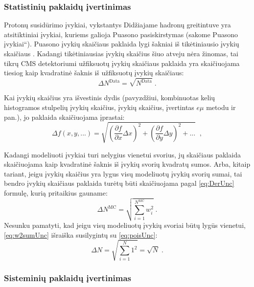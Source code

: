 \documentclass[a4paper, 12pt]{article}
\newcommand{\ltq}[1]{{\quotedblbase{}#1\textquotedblleft{}}}
\newlength\q
\begin{document}
\subsubsection{Statistinių paklaidų įvertinimas}
Protonų susidūrimo įvykiai, vykstantys Didžiajame hadronų greitintuve yra atsitiktiniai įvykiai, kuriems galioja Puasono pasiskirstymas (sakome \ltq{Puasono įvykiai}). Puasono įvykių skaičiaus paklaida lygi šakniai iš tikėtiniausio įvykių skaičiaus \cite{Poisson}. Kadangi tikėtiniausias įvykių skaičius šiuo atveju nėra žinomas, tai tikrų CMS detektoriumi užfiksuotų įvykių skaičiaus paklaida yra skaičiuojama tiesiog kaip kvadratinė šaknis iš užfiksuotų įvykių skaičiaus:
\begin{equation}
\Delta N^{\mathrm{Data}} = \sqrt{N^{\mathrm{Data}}} \; .
\label{eq:poisUnc}
\end{equation}

Kai įvykių skaičius yra išvestinis dydis (pavyzdžiui, kombinuotas kelių histogramos stulpelių įvykių skaičius, įvykių skaičius, įvertintas $e\mu$ metodu ir pan.), jo paklaida skaičiuojama įprastai:
\begin{equation}
\Delta f(x, y, ...) = \sqrt{\left(\frac{\partial f}{\partial x}\Delta x\right)^{2}+\left(\frac{\partial f}{\partial y}\Delta y\right)^{2}+...} \;\; \mathrm{,}
\label{eq:DerUnc}
\end{equation}

Kadangi modeliuoti įvykiai turi nelygius vienetui svorius, jų skaičiaus paklaida skaičiuojama kaip kvadratinė šaknis iš įvykių svorių kvadratų sumos. Arba, kitaip tariant, jeigu įvykių skaičius yra lygus visų modeliuotų įvykių svorių sumai, tai bendro įvykių skaičiaus paklaida turėtų būti skaičiuojama pagal \eqref{eq:DerUnc} formulę, kurią pritaikius gauname:
\begin{equation}
\Delta N^{\mathrm{MC}} = \sqrt{\sum_{i=1}^{N^{\mathrm{MC}}}w_{i}^{2}} \; .
\label{eq:w2sumUnc}
\end{equation}
Nesunku pamatyti, kad jeigu visų modeliuotų įvykių svoriai būtų lygūs vienetui, \eqref{eq:w2sumUnc} išraiška susilygintų su \eqref{eq:poisUnc}:
\begin{equation}
\Delta N = \sqrt{\sum_{i=1}^{N}1^{2}}=\sqrt{N} \; .
\label{eq:Useless}
\end{equation}

\subsubsection{Sisteminių paklaidų įvertinimas}
\end{document}
